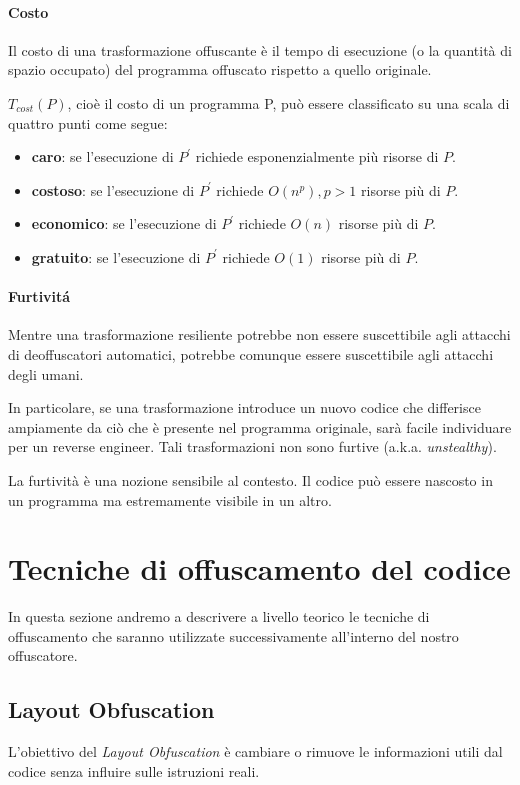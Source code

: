 \documentclass[a4paper,oneside,openright,titlepage,10pt,footinclude,headinclude]{scrbook}
\begin{document}
\paragraph{Costo}
Il costo di una trasformazione offuscante è il tempo di esecuzione (o la quantità di spazio occupato) del programma offuscato rispetto a quello originale.\smallskip

\noindent $T_{cost}(P)$, cioè il costo di un programma P, può essere classificato su una scala di quattro punti come segue:
\begin{itemize}
\item
\textbf{caro}: se l'esecuzione di $P^{'}$ richiede esponenzialmente più risorse di $P$.
 \item
\textbf{costoso}: se l'esecuzione di $P^{'}$ richiede $O(n^{p}), p>1$ risorse più di $P$.
 \item
\textbf{economico}: se l'esecuzione di $P^{'}$ richiede $O(n)$ risorse più di $P$.
 \item
\textbf{gratuito}: se l'esecuzione di $P^{'}$ richiede $O(1)$ risorse più di $P$.
\end{itemize}


 \paragraph{Furtivit\'a}
 Mentre una trasformazione resiliente potrebbe non essere suscettibile agli attacchi di deoffuscatori automatici, potrebbe comunque essere suscettibile agli attacchi degli umani.
 
In particolare, se una trasformazione introduce un nuovo codice che differisce ampiamente da ciò che è presente nel programma originale, sarà facile individuare per un reverse engineer. Tali trasformazioni non sono furtive (a.k.a. \emph{unstealthy}).

La furtività è una nozione sensibile al contesto. Il codice può essere nascosto in un programma ma estremamente visibile in un altro.\\

\section{Tecniche di offuscamento del codice}
In questa sezione andremo a descrivere a livello teorico le tecniche di offuscamento che saranno utilizzate successivamente all'interno del nostro offuscatore.

\subsection{Layout Obfuscation}
L'obiettivo del \emph{Layout Obfuscation} è cambiare o rimuove le informazioni utili dal codice senza influire sulle istruzioni reali.\medskip
\end{document}
